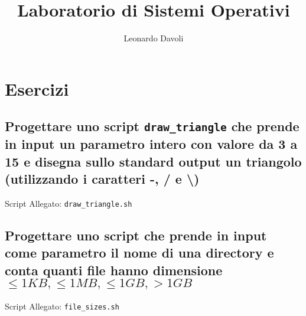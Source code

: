 \documentclass{article}
\author{Leonardo Davoli}
\title{Laboratorio di Sistemi Operativi}
\begin{document}
\maketitle

\setcounter{section}{3} %
\section{Esercizi}

\subsection{Progettare uno script \texttt{draw\_triangle} che prende in input un parametro intero con valore da 3 a 15 
e disegna sullo standard output un triangolo (utilizzando i caratteri -, / e \textbackslash)}

Script Allegato: \texttt{draw\_triangle.sh}

\subsection{Progettare uno script che prende in input come parametro il nome di una directory e conta quanti file hanno dimensione 
$\leq 1KB, \leq 1MB, \leq 1GB, > 1GB$}

Script Allegato: \texttt{file\_sizes.sh}
\end{document}
